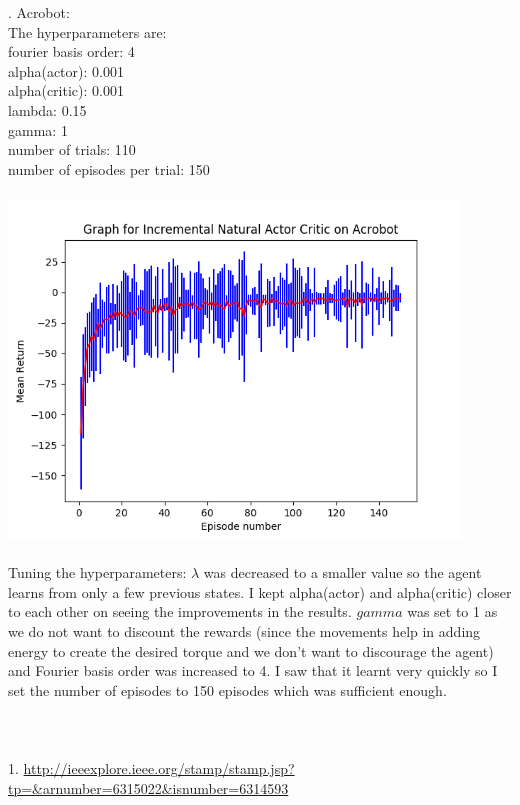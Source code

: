 \documentclass{article}
\begin{document}
. Acrobot: \\ 
The hyperparameters are: \\
fourier basis order: 4 \\
alpha(actor): 0.001 \\
alpha(critic): 0.001 \\
lambda: 0.15 \\
gamma: 1 \\
number of trials: 110 \\ 
number of episodes per trial: 150 \\ \\
\includegraphics[width=12cm]{acrobot} \\ \\
Tuning the hyperparameters: $\lambda$ was decreased to a smaller value so the agent learns from only a few previous states. I kept alpha(actor) and alpha(critic) closer to each other on seeing the improvements in the results. $gamma$ was set to 1 as we do not want to discount the rewards (since the movements help in adding energy to create the desired torque and we don't want to discourage the agent) and Fourier basis order was increased to 4. I saw that it learnt very quickly so I set the number of episodes to 150 episodes which was sufficient enough. \\ \\
 \\ \\
1. \url{http://ieeexplore.ieee.org/stamp/stamp.jsp?tp=&arnumber=6315022&isnumber=6314593}
\end{document}
